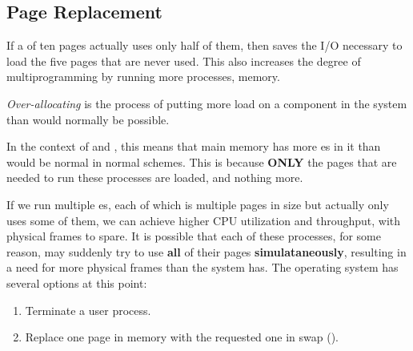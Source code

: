 \subsection{Page Replacement}\label{subsec:Page_Replacement}
If a  of ten pages actually uses only half of them, then  saves the I/O necessary to load the five pages that are never used.
This also increases the degree of multiprogramming by running more processes,  memory.

\begin{definition}\label{def:Over_Allocating}
  \emph{Over-allocating} is the process of putting more load on a component in the system than would normally be possible.

  In the context of  and , this means that main memory has more es in it than would be normal in normal  schemes.
  This is because \textbf{ONLY} the pages that are needed to run these processes are loaded, and nothing more.
\end{definition}

If we run multiple es, each of which is multiple pages in size but actually only uses some of them, we can achieve higher CPU utilization and throughput, with physical frames to spare.
It is possible that each of these processes, for some reason, may suddenly try to use \textbf{all} of their pages \textbf{simulataneously}, resulting in a need for more physical frames than the system has.
The operating system has several options at this point:
\begin{enumerate}[noitemsep]
\item Terminate a user process.
\item Replace one page in memory with the requested one in swap ().
\end{enumerate}


